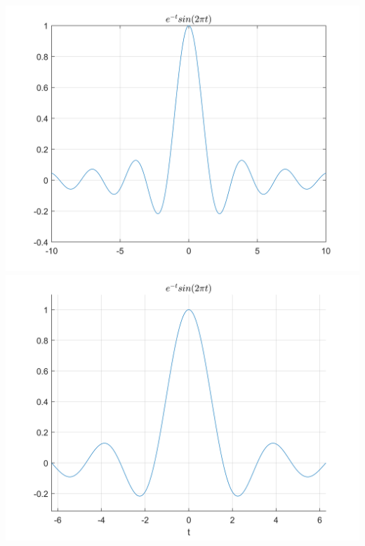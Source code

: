 \documentclass[UTF8,a4paper]{article}
\begin{document}
\includegraphics[scale=0.5]{8-4-1.png}
\includegraphics[scale=0.5]{8-4-2.png}\\
\end{document}
